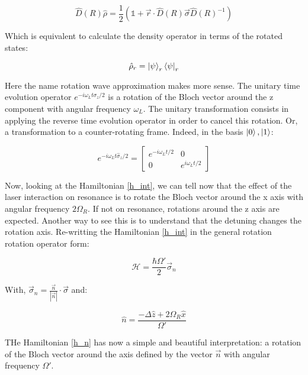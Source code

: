 \begin{equation}
    \hat{D}(R) \hat{\rho} = \frac{1}{2}(\mathbb{1} + \vec{r}\cdot \hat{D}(R) \vec{\sigma} \hat{D}(R)^{-1})
\end{equation}

Which is equivalent to calculate the density operator in terms of the rotated states:

\begin{equation}
    \hat{\rho}_{r} = \ket{\psi}_{r} \bra{\psi}_{r}
\end{equation}

Here the name rotation wave approximation makes more sense. The unitary time evolution operator $e^{-i \omega_{L} t \sigma_{z}/2}$ is a rotation of the Bloch vector around the z component with angular frequency $\omega_{L}$.
The unitary transformation consists in applying the reverse time evolution operator in order to cancel this rotation. Or, a transformation to a counter-rotating frame. Indeed, in the basis {$\ket{0}, \ket{1}$}:

\[
e^{- i \omega_{L}t \hat{\sigma}_{z}/2} =
  \begin{bmatrix}
    e^{- i \omega_{L}t/2} & 0  \\
    0 & e^{ i \omega_{L}t /2}
  \end{bmatrix}
\]

Now, looking at the Hamiltonian \ref{h_int}, we can tell now that the effect of the laser interaction on resonance is to rotate the Bloch vector around the x axis with angular frequency $2\Omega_{R}$. If not on resonance, rotations around the z axis are expected. Another way to see this is to understand that the detuning changes the rotation axis. Re-writting the Hamiltonian \ref{h_int} in the general rotation rotation operator form:

\begin{equation} \label{h_n}
    \mathcal{H} = \frac{\hbar \Omega'}{2} \vec{\sigma}_{n}
\end{equation}

With, $\vec{\sigma}_{n} = \frac{\vec{n}}{|\vec{n}|} \cdot \vec{\sigma}$ and:

\begin{equation}
    \hat{n} = \frac{- \Delta \hat{z} + 2\Omega_{R} \hat{x}} {\Omega'}
\end{equation}

THe Hamiltonian \ref{h_n} has now a simple and beautiful interpretation: a rotation of the Bloch vector around the axis defined by the vector $\vec{n}$ with angular frequency $\Omega'$.

